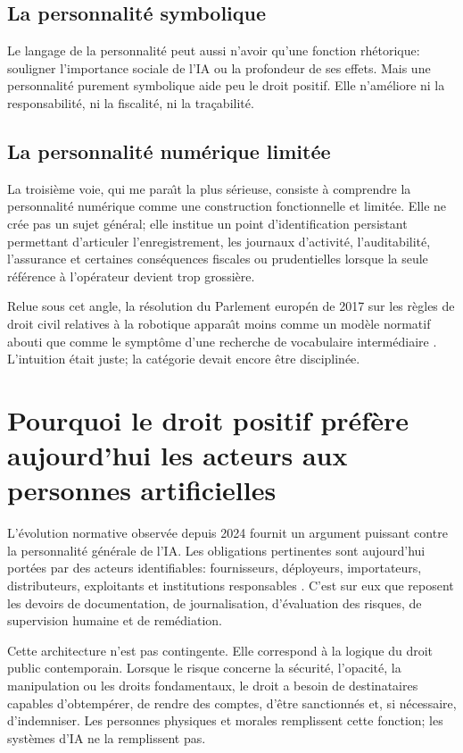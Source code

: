 \documentclass[11pt]{article}
\begin{document}
\subsection{La personnalit{\'e} symbolique}
Le langage de la personnalit{\'e} peut aussi n'avoir qu'une fonction rh{\'e}torique: souligner l'importance sociale de l'IA ou la profondeur de ses effets. Mais une personnalit{\'e} purement symbolique aide peu le droit positif. Elle n'am{\'e}liore ni la responsabilit{\'e}, ni la fiscalit{\'e}, ni la tra{\c c}abilit{\'e}.

\subsection{La personnalit{\'e} num{\'e}rique limit{\'e}e}
La troisi{\`e}me voie, qui me para{\^\i}t la plus s{\'e}rieuse, consiste {\`a} comprendre la personnalit{\'e} num{\'e}rique comme une construction fonctionnelle et limit{\'e}e. Elle ne cr{\'e}e pas un sujet g{\'e}n{\'e}ral; elle institue un point d'identification persistant permettant d'articuler l'enregistrement, les journaux d'activit{\'e}, l'auditabilit{\'e}, l'assurance et certaines cons{\'e}quences fiscales ou prudentielles lorsque la seule r{\'e}f{\'e}rence {\`a} l'op{\'e}rateur devient trop grossi{\`e}re.

Relue sous cet angle, la r{\'e}solution du Parlement europ{\'e}n de 2017 sur les r{\`e}gles de droit civil relatives {\`a} la robotique appara{\^\i}t moins comme un mod{\`e}le normatif abouti que comme le sympt{\^o}me d'une recherche de vocabulaire interm{\'e}diaire \citep{ep2017robotics}. L'intuition {\'e}tait juste; la cat{\'e}gorie devait encore {\^e}tre disciplin{\'e}e.

\section{Pourquoi le droit positif pr{\'e}f{\`e}re aujourd'hui les acteurs aux personnes artificielles}
L'{\'e}volution normative observ{\'e}e depuis 2024 fournit un argument puissant contre la personnalit{\'e} g{\'e}n{\'e}rale de l'IA. Les obligations pertinentes sont aujourd'hui port{\'e}es par des acteurs identifiables: fournisseurs, d{\'e}ployeurs, importateurs, distributeurs, exploitants et institutions responsables \citep{eu2024aiact,ec2026aiactfaq}. C'est sur eux que reposent les devoirs de documentation, de journalisation, d'{\'e}valuation des risques, de supervision humaine et de rem{\'e}diation.

Cette architecture n'est pas contingente. Elle correspond {\`a} la logique du droit public contemporain. Lorsque le risque concerne la s{\'e}curit{\'e}, l'opacit{\'e}, la manipulation ou les droits fondamentaux, le droit a besoin de destinataires capables d'obtemp{\'e}rer, de rendre des comptes, d'{\^e}tre sanctionn{\'e}s et, si n{\'e}cessaire, d'indemniser. Les personnes physiques et morales remplissent cette fonction; les syst{\`e}mes d'IA ne la remplissent pas.
\end{document}
